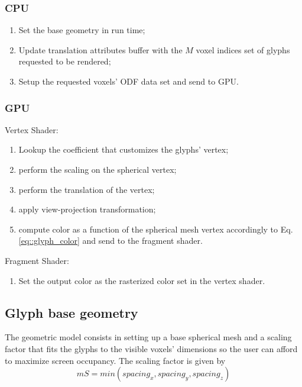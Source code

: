 \documentclass[twoside,twocolumn,10pt]{article}
\begin{document}
\subsubsection{CPU}
\begin{enumerate}
    \item Set the base geometry in run time;
    \item Update translation attributes buffer with the $M$ voxel indices set of glyphs requested to be rendered;
    \item Setup the requested voxels' ODF data set and send to GPU.
\end{enumerate}

\subsubsection{GPU}
Vertex Shader:
\begin{enumerate}
    \item Lookup the coefficient that customizes the glyphs' vertex; 
    \item perform the scaling on the spherical vertex;
    \item perform the translation of the vertex;
    \item apply view-projection transformation;
    \item compute color as a function of the spherical mesh vertex accordingly to Eq. \ref{eq::glyph_color} and send to the fragment shader.
\end{enumerate}

Fragment Shader:
\begin{enumerate}
    \item Set the output color as the rasterized color set in the vertex shader.
\end{enumerate}






\subsection{Glyph base geometry}
\label{ssec::glyph_resolution}


The geometric model consists in setting up a base spherical mesh and a scaling factor that fits the glyphs to the visible voxels' dimensions so the user can afford to maximize screen occupancy. The scaling factor is given by 
\begin{equation}
\label{eq:spacings}
mS = min(spacing_x, spacing_y, spacing_z)
\end{equation}
\end{document}

